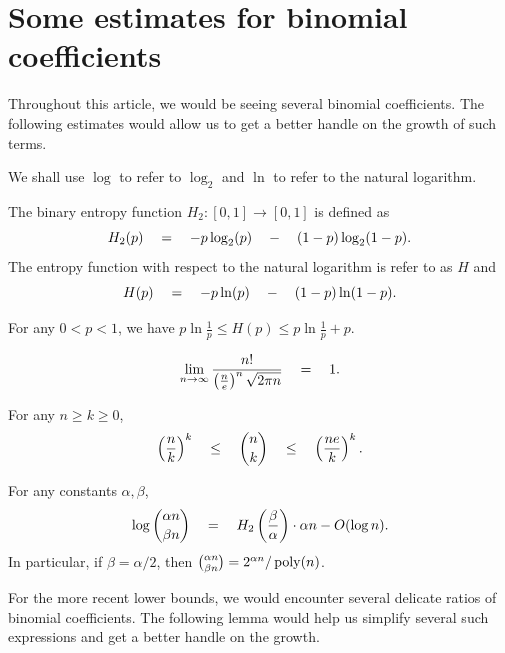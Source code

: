 \chapter{Some estimates for binomial coefficients}\label{chap:binom-estimates}

Throughout this article, we would be seeing several binomial coefficients.  
The following estimates would allow us to get a better handle on the growth of such terms. 

We shall use $\log$ to refer to $\log_2$ and $\ln$ to refer to the natural logarithm. 


\begin{definition}\label{def:entropy}
The binary entropy function $H_2:[0,1]\rightarrow [0,1]$ is defined as
\[
H_2(p) \quad = \quad - p \log_2(p) \quad - \quad (1-p) \log_2(1-p).
\]
The entropy function with respect to the natural logarithm is refer to as $H$ and
\[
H(p) \quad = \quad - p \ln(p) \quad - \quad (1-p) \ln(1-p).
\]
\end{definition}

\begin{proposition}\label{prop:entropy-estimate}
For any $0< p  < 1$, we have $p\ln\frac{1}{p} \leq H(p) \leq p\ln\frac{1}{p} + p$. 
\end{proposition}


\begin{proposition}\label{prop:sterling}
\[
\lim_{n\rightarrow \infty}\frac{n!}{\left(\frac{n}{e}\right)^n \sqrt{2\pi n}}  \quad=\quad 1.
\]
\end{proposition}

\begin{proposition}\label{prop:binom-ub-lb}
For any $n \geq  k \geq 0$, 
\[
\left(\frac{n}{k}\right)^k \quad \leq \quad \binom{n}{k}\quad \leq \quad \left(\frac{ne}{k}\right)^k.
\]
\end{proposition}


\begin{proposition}
For any constants $\alpha, \beta$, 
\[
\log\binom{\alpha n}{\beta n} \quad = \quad H_2\left(\frac{\beta}{\alpha}\right) \cdot \alpha n - O(\log n).
\]
In particular, if $\beta = \alpha/2$, then $\binom{\alpha n}{\beta{n}} = 2^{\alpha n} / \operatorname{poly}(n)$. 
\end{proposition}

For the more recent lower bounds, we would encounter several delicate ratios of binomial coefficients. 
The following lemma would help us simplify several such expressions and get a better handle on the growth. 

